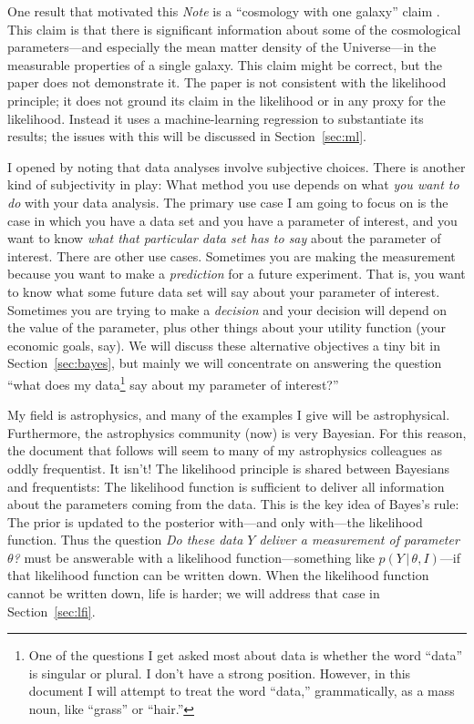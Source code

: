 \documentclass{article}
\newcommand{\documentname}{\textsl{Note}}
\newcommand{\sectionname}{Section}
\newcommand{\secref}[1]{\sectionname~\ref{#1}}
\newcommand{\given}{\,|\,}
\begin{document}
One result that motivated this \documentname{} is a ``cosmology with one galaxy'' claim \cite{onegalaxy}.
This claim is that there is significant information about some of the cosmological parameters---and especially the mean matter density of the Universe---in the measurable properties of a single galaxy.
This claim might be correct, but the paper does not demonstrate it.
The paper is not consistent with the likelihood principle; it does not ground its claim in the likelihood or in any proxy for the likelihood.
Instead it uses a machine-learning regression to substantiate its results; the issues with this will be discussed in \secref{sec:ml}.

I opened by noting that data analyses involve subjective choices.
There is another kind of subjectivity in play:
What method you use depends on what \emph{you want to do} with your data analysis.
The primary use case I am going to focus on is the case in which you have a data set and you have a parameter of interest, and you want to know \emph{what that particular data set has to say} about the parameter of interest.
There are other use cases.
Sometimes you are making the measurement because you want to make a \emph{prediction} for a future experiment.
That is, you want to know what some future data set will say about your parameter of interest.
Sometimes you are trying to make a \emph{decision} and your decision will depend on the value of the parameter, plus other things about your utility function (your economic goals, say).
We will discuss these alternative objectives a tiny bit in \secref{sec:bayes}, but mainly we will concentrate on answering the question ``what does my data\footnote{%
One of the questions I get asked most about data is whether the word ``data'' is singular or plural. I don't have a strong position. However, in this document I will attempt to treat the word ``data,'' grammatically, as a mass noun, like ``grass'' or ``hair.''}
say about my parameter of interest?''

My field is astrophysics, and many of the examples I give will be astrophysical.
Furthermore, the astrophysics community (now) is very Bayesian.
For this reason, the document that follows will seem to many of my astrophysics colleagues as oddly frequentist.
It isn't!
The likelihood principle is shared between Bayesians and frequentists:
The likelihood function is sufficient to deliver all information about the parameters coming from the data.
This is the key idea of Bayes's rule:
The prior is updated to the posterior with---and only with---the likelihood function.
Thus the question \emph{Do these data $Y$ deliver a measurement of parameter $\theta$?} must be answerable with a likelihood function---something like $p(Y\given\theta,I)$---if that likelihood function can be written down.
When the likelihood function cannot be written down, life is harder; we will address that case in \secref{sec:lfi}.
\end{document}
